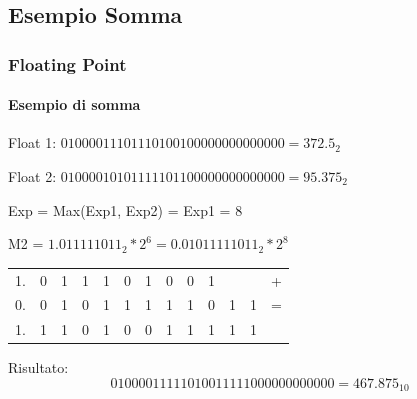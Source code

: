 \documentclass{beamer}
\begin{document}
	\subsection{Esempio Somma}
  \begin{frame}
    \frametitle{Floating Point}
    \framesubtitle{Esempio di somma}
    Float 1: $01000011101110100100000000000000 = 372.5_{2}$
    
    Float 2: $01000010101111101100000000000000 = 95.375_{2}$
    
    \pause
    \vspace{2em}
    
    Exp = Max(Exp1, Exp2) = Exp1 = 8
    
    M2 = $1.011111011_{2} * 2^{6} = 0.01011111011_{2} * 2^{8}$
    \vspace{1em}
    
    \setlength{\tabcolsep}{2pt}
    \begin{center}
    		\begin{tabular}{cccccccccccc|c}
    		1. & 0 & 1 & 1 & 1 & 0 & 1 & 0 & 0 & 1 &   &   & + \\ 
    		0. & 0 & 1 & 0 & 1 & 1 & 1 & 1 & 1 & 0 & 1 & 1 & = \\ 
    		\hline 
    		1. & 1 & 1 & 0 & 1 & 0 & 0 & 1 & 1 & 1 & 1 & 1 &   \\ 
    		\end{tabular} 
    \end{center}
    
    \pause 
    \vspace{1em}
    Risultato:
    $$01000011111010011111000000000000 = 467.875_{10}$$
  \end{frame}
\end{document}
